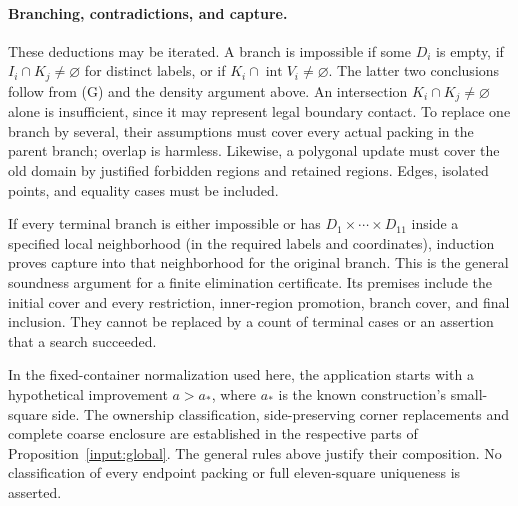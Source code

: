 \documentclass[11pt]{article}
\begin{document}
\paragraph{Branching, contradictions, and capture.}
These deductions may be iterated.  A branch is impossible if some $D_i$
is empty, if $I_i\cap K_j\ne\varnothing$ for distinct labels, or if
$K_i\cap\operatorname{int}V_i\ne\varnothing$.  The latter two conclusions
follow from (G) and the density argument above.  An intersection
$K_i\cap K_j\ne\varnothing$ alone is insufficient, since it may represent
legal boundary contact.  To replace one branch by several, their assumptions
must cover every actual packing in the parent branch; overlap is harmless.
Likewise, a polygonal update must cover the old domain by justified
forbidden regions and retained regions.  Edges, isolated points, and
equality cases must be included.

If every terminal branch is either impossible or has
$D_1\times\cdots\times D_{11}$ inside a specified local neighborhood
(in the required labels and coordinates), induction proves capture into
that neighborhood for the original branch.  This is the general soundness
argument for a finite elimination certificate.  Its premises include the
initial cover and every restriction, inner-region promotion, branch cover,
and final inclusion.  They cannot be replaced by a count of terminal cases
or an assertion that a search succeeded.

In the fixed-container normalization used here, the application starts
with a hypothetical improvement $a>a_*$, where $a_*$ is the known
construction's small-square side. The ownership classification,
side-preserving corner replacements and complete coarse enclosure are
established in the respective parts of Proposition~\ref{input:global}.
The general rules above justify their composition. No classification of
every endpoint packing or full eleven-square uniqueness is asserted.
\end{document}
